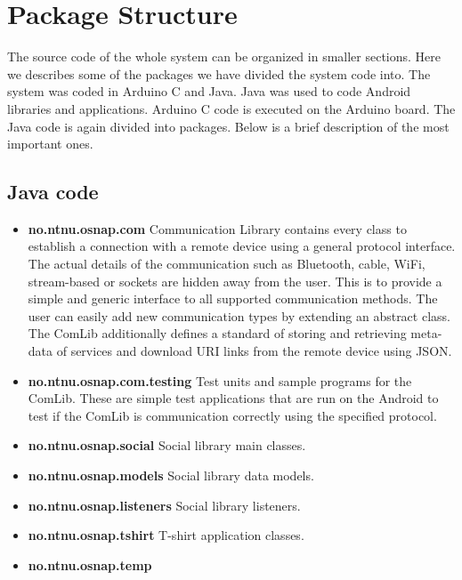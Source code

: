 \section{Package Structure}
The source code of the whole system can be organized in smaller sections.
Here we describes some of the packages we have divided the system code into.
The system was coded in Arduino C and Java. Java was used to code Android libraries and applications.
Arduino C code is executed on the Arduino board. The Java code is again divided into packages.
Below is a brief description of the most important ones.

\subsection{Java code}
\begin{itemize}
	\item \textbf{no.ntnu.osnap.com}\newline
		Communication Library contains every class to establish a connection with a remote device using a general
		protocol interface. The actual details of the communication such as Bluetooth, cable, WiFi, stream-based or
		sockets are hidden away from the user. This is to provide a simple and generic interface to all supported
		communication methods. The user can easily add new communication types by extending an abstract class.
		The ComLib additionally defines a standard of storing and retrieving meta-data of services and download URI
		links from the remote device using JSON.
	\item \textbf{no.ntnu.osnap.com.testing}\newline
		Test units and sample programs for the ComLib. These are simple test applications that are run on
		the Android to test if the ComLib is communication correctly using the specified
		protocol.
	\item \textbf{no.ntnu.osnap.social}\newline
		Social library main classes.
	\item \textbf{no.ntnu.osnap.models}\newline
		Social library data models.
	\item \textbf{no.ntnu.osnap.listeners}\newline
		Social library listeners.
	\item \textbf{no.ntnu.osnap.tshirt}\newline
		T-shirt application classes.
	\item \textbf{no.ntnu.osnap.temp}\newline

\end{itemize}
